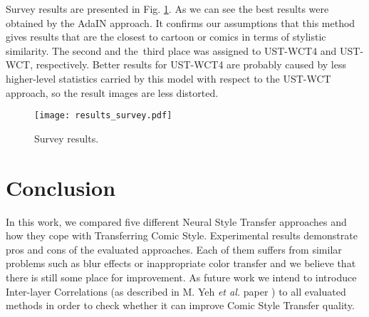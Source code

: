 \documentclass{llncs}
\begin{document}
Survey results are presented in Fig. \ref{survey:results}. As we can see the best results were obtained by the AdaIN approach. It confirms our assumptions that this method gives results that are the closest to cartoon or comics in terms of stylistic similarity. The second and the third place was assigned to UST-WCT4 and UST-WCT, respectively. Better results for UST-WCT4 are probably caused by less higher-level statistics carried by this model with respect to the UST-WCT approach, so the result images are less distorted.

\begin{figure}[H]
  \centering
  \texttt{[image: results\_survey.pdf]}
  \caption{Survey results.\label{survey:results}}
\end{figure}

%
\section{Conclusion}
%

In this work, we compared five different Neural Style Transfer approaches and how they cope with Transferring Comic Style. Experimental results demonstrate pros and cons of the evaluated approaches. Each of them suffers from similar problems such as blur effects or inappropriate color transfer and we believe that there is still some place for improvement. As future work we intend to introduce Inter-layer Correlations (as described in M. Yeh \textit{et al.} paper \cite{inter:layer}) to all evaluated methods in order to check whether it can improve Comic Style Transfer quality. %
\end{document}
